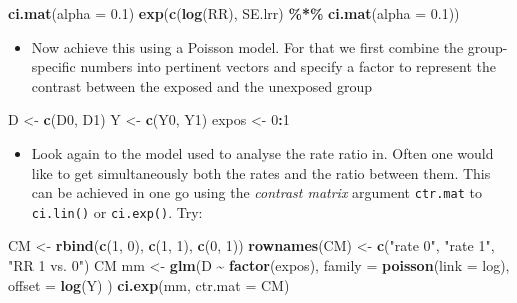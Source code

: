 \documentclass[
]{book}
\newenvironment{Shaded}{\begin{snugshade}}{\end{snugshade}}
\newcommand{\AttributeTok}[1]{\textcolor[rgb]{0.13,0.29,0.53}{#1}}
\newcommand{\DecValTok}[1]{\textcolor[rgb]{0.00,0.00,0.81}{#1}}
\newcommand{\FloatTok}[1]{\textcolor[rgb]{0.00,0.00,0.81}{#1}}
\newcommand{\FunctionTok}[1]{\textcolor[rgb]{0.13,0.29,0.53}{\textbf{#1}}}
\newcommand{\NormalTok}[1]{#1}
\newcommand{\OtherTok}[1]{\textcolor[rgb]{0.56,0.35,0.01}{#1}}
\newcommand{\SpecialCharTok}[1]{\textcolor[rgb]{0.81,0.36,0.00}{\textbf{#1}}}
\newcommand{\StringTok}[1]{\textcolor[rgb]{0.31,0.60,0.02}{#1}}
\providecommand{\tightlist}{%
  \setlength{\itemsep}{0pt}\setlength{\parskip}{0pt}}
\begin{document}
\begin{Shaded}
\begin{Highlighting}[]
\FunctionTok{ci.mat}\NormalTok{(}\AttributeTok{alpha =} \FloatTok{0.1}\NormalTok{)}
\FunctionTok{exp}\NormalTok{(}\FunctionTok{c}\NormalTok{(}\FunctionTok{log}\NormalTok{(RR), SE.lrr) }\SpecialCharTok{\%*\%} \FunctionTok{ci.mat}\NormalTok{(}\AttributeTok{alpha =} \FloatTok{0.1}\NormalTok{))}
\end{Highlighting}
\end{Shaded}

\begin{itemize}
\tightlist
\item
  Now achieve this using a Poisson model. For that we first combine
  the group-specific numbers into pertinent vectors and specify a factor to represent the contrast between the exposed and the unexposed group
\end{itemize}

\begin{Shaded}
\begin{Highlighting}[]
\NormalTok{D }\OtherTok{\textless{}{-}} \FunctionTok{c}\NormalTok{(D0, D1)}
\NormalTok{Y }\OtherTok{\textless{}{-}} \FunctionTok{c}\NormalTok{(Y0, Y1)}
\NormalTok{expos }\OtherTok{\textless{}{-}} \DecValTok{0}\SpecialCharTok{:}\DecValTok{1}
\end{Highlighting}
\end{Shaded}

\begin{itemize}
\tightlist
\item
  Look again to the model used to analyse the rate ratio in. Often one would like to get simultaneously both
  the rates and the ratio between them. This can be achieved in one go
  using the \emph{contrast matrix} argument \texttt{ctr.mat} to
  \texttt{ci.lin()} or \texttt{ci.exp()}. Try:
\end{itemize}

\begin{Shaded}
\begin{Highlighting}[]
\NormalTok{CM }\OtherTok{\textless{}{-}} \FunctionTok{rbind}\NormalTok{(}\FunctionTok{c}\NormalTok{(}\DecValTok{1}\NormalTok{, }\DecValTok{0}\NormalTok{), }\FunctionTok{c}\NormalTok{(}\DecValTok{1}\NormalTok{, }\DecValTok{1}\NormalTok{), }\FunctionTok{c}\NormalTok{(}\DecValTok{0}\NormalTok{, }\DecValTok{1}\NormalTok{))}
\FunctionTok{rownames}\NormalTok{(CM) }\OtherTok{\textless{}{-}} \FunctionTok{c}\NormalTok{(}\StringTok{"rate 0"}\NormalTok{, }\StringTok{"rate 1"}\NormalTok{, }\StringTok{"RR 1 vs. 0"}\NormalTok{)}
\NormalTok{CM}
\NormalTok{mm }\OtherTok{\textless{}{-}} \FunctionTok{glm}\NormalTok{(D }\SpecialCharTok{\textasciitilde{}} \FunctionTok{factor}\NormalTok{(expos),}
  \AttributeTok{family =} \FunctionTok{poisson}\NormalTok{(}\AttributeTok{link =}\NormalTok{ log), }\AttributeTok{offset =} \FunctionTok{log}\NormalTok{(Y)}
\NormalTok{)}
\FunctionTok{ci.exp}\NormalTok{(mm, }\AttributeTok{ctr.mat =}\NormalTok{ CM)}
\end{Highlighting}
\end{Shaded}
\end{document}
